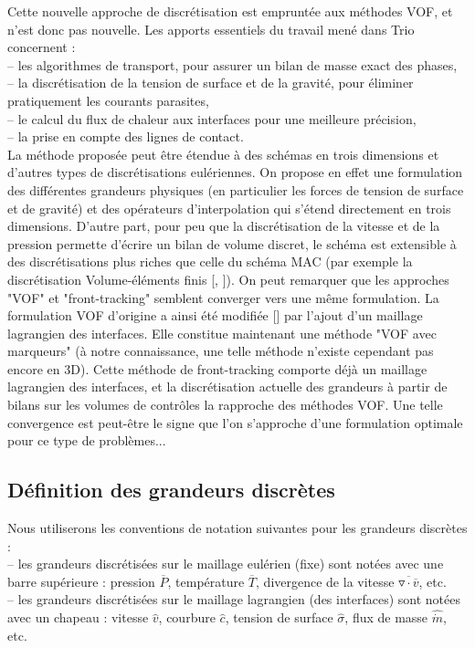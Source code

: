 Cette nouvelle approche de discr\'etisation est emprunt\'ee aux m\'ethodes VOF, et
n’est donc pas nouvelle. Les apports essentiels du travail men\'e dans Trio concernent :\\
– les algorithmes de transport, pour assurer un bilan de masse exact des
phases,\\
– la discr\'etisation de la tension de surface et de la gravit\'e, pour \'eliminer pratiquement les courants parasites,\\
– le calcul du flux de chaleur aux interfaces pour une meilleure pr\'ecision,\\
– la prise en compte des lignes de contact.\\
La m\'ethode propos\'ee peut \^etre \'etendue \`a des sch\'emas en trois dimensions et d’autres types de discr\'etisations eul\'eriennes. On propose en effet une formulation des diff\'erentes grandeurs physiques (en particulier les forces de tension de surface et de gravit\'e) et des op\'erateurs d’interpolation qui s’\'etend directement en trois dimensions. D’autre part, pour peu que la discr\'etisation de la vitesse et de la pression permette d’\'ecrire un bilan de volume discret, le sch\'ema est extensible à des discr\'etisations plus riches que celle du sch\'ema MAC (par exemple la discr\'etisation Volume-\'el\'ements finis [\cite{Emonot2003}, \cite{Heib2003}]).
On peut remarquer que les approches "VOF" et "front-tracking" semblent converger vers une même formulation. La formulation VOF d’origine a ainsi \'et\'e modifi\'ee [\cite{Popinet2000}] par l’ajout d’un maillage lagrangien des interfaces. Elle constitue maintenant une m\'ethode "VOF avec marqueurs" (\`a notre connaissance, une telle m\'ethode n’existe cependant pas encore en 3D). Cette m\'ethode de front-tracking comporte d\'ejà un maillage lagrangien des interfaces, et la discr\'etisation actuelle
des grandeurs à partir de bilans sur les volumes de contr\^oles la rapproche des
m\'ethodes VOF. Une telle convergence est peut-\^etre le signe que l’on s’approche
d’une formulation optimale pour ce type de probl\`emes...

\subsection{D\'efinition des grandeurs discr\`etes}
Nous utiliserons les conventions de notation suivantes pour les grandeurs discr\`etes :\\
– les grandeurs discr\'etis\'ees sur le maillage eul\'erien (fixe) sont not\'ees avec une barre sup\'erieure : pression $\overline{P}$, temp\'erature $\overline{T}$, divergence de la vitesse $\overline{\triangledown \cdot \overline{v}}$, etc.\\
– les grandeurs discr\'etis\'ees sur le maillage lagrangien (des interfaces) sont
not\'ees avec un chapeau : vitesse $\hat{v}$, courbure $\hat{c}$, tension de surface $\hat{\sigma}$, flux de masse $\hat{\dot{m}}$, etc.

